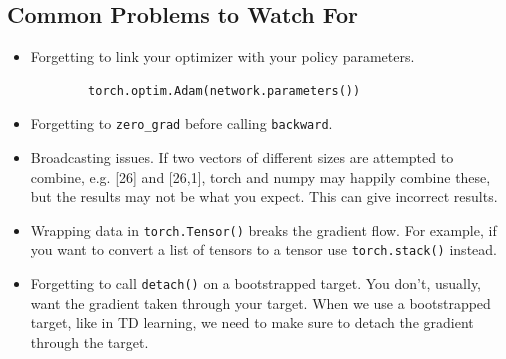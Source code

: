 \documentclass{article}
\begin{document}
\subsection{Common Problems to Watch For}

\begin{itemize}
    \item Forgetting to link your optimizer with your policy parameters.
    \begin{verbatim}
        torch.optim.Adam(network.parameters())
    \end{verbatim}
    \item Forgetting to \verb|zero_grad| before calling \verb|backward|.
    \item Broadcasting issues. If two vectors of different sizes are attempted to combine, e.g. [26] and [26,1], torch and numpy may happily combine these, but the results may not be what you expect. This can give incorrect results.
    \item Wrapping data in \verb|torch.Tensor()| breaks the gradient flow. For example, if you want to convert a list of tensors to a tensor use \verb|torch.stack()| instead.
    \item Forgetting to call \verb|detach()| on a bootstrapped target. You don't, usually, want the gradient taken through your target. When we use a bootstrapped target, like in TD learning, we need to make sure to detach the gradient through the target.
\end{itemize}
\end{document}
